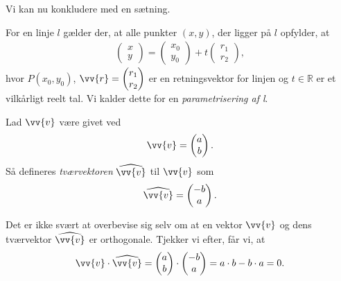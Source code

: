 Vi kan nu konkludere med en sætning.
\begin{setn}
For en linje $l$ gælder der, at alle punkter $(x,y)$, der ligger på $l$ opfylder, at
\begin{align*}
\begin{pmatrix}
x \\ y
\end{pmatrix}
=
\begin{pmatrix}
x_0 \\ y_0
\end{pmatrix} 
+
t
\begin{pmatrix}
r_1 \\ r_2
\end{pmatrix},
\end{align*} 
hvor $P(x_0,y_0)$, $\vv{r} = \begin{pmatrix}
r_1 \\ r_2
\end{pmatrix}$
er en retningsvektor for linjen og $t\in \mathbb{R}$ er et vilkårligt reelt tal. Vi kalder dette for en \textit{parametrisering af l}.
\end{setn}
\begin{defn}[Tværvektor]
	Lad $\vv{v}$ være givet ved
	\begin{align*}
		\vv{v} = 
		\begin{pmatrix}
			a \\ b
		\end{pmatrix}.
	\end{align*}
	Så defineres \textit{tværvektoren} $\widehat{\vv{v}}$ til $\vv{v}$ som 
	\begin{align*}
		\widehat{\vv{v}} = 
		\begin{pmatrix}
			-b \\ a
		\end{pmatrix}.
	\end{align*}
\end{defn}
Det er ikke svært at overbevise sig selv om at en vektor $\vv{v}$ og dens tværvektor $\widehat{\vv{v}}$ er orthogonale. Tjekker vi efter, får vi, at 
\begin{align*}
	\vv{v} \cdot \widehat{\vv{v}} = 
	\begin{pmatrix}
		a \\ b
	\end{pmatrix} \cdot
	\begin{pmatrix}
		-b \\ a
	\end{pmatrix} = 
	a\cdot b - b\cdot a = 0. 
\end{align*}
